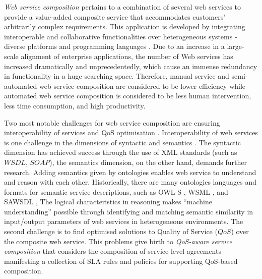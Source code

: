 \documentclass{llncs}
\begin{document}
\textit{Web service composition} pertains to a combination of several web services to provide a value-added composite service that accommodates customers' arbitrarily complex requirements. This application is developed by integrating interoperable and collaborative functionalities over heterogeneous systems - diverse platforms and programming languages \cite{casati2001technologies}. Due to an increase in a large-scale alignment of enterprise applications, the number of Web services has increased dramatically and unprecedentedly, which cause an immense redundancy in functionality in a huge searching space. Therefore, manual service and semi-automated web service composition are considered to be lower efficiency while automated web service composition is considered to be less human intervention, less time consumption, and high productivity.

Two most notable challenges for web service composition are ensuring interoperability of services and QoS optimisation \cite{fensel2011semantic}. Interoperability of web services is one challenge in the dimensions of syntactic and semantics \cite{fensel2011semantic}. The syntactic dimension has achieved success through the use of XML standards (such as $WSDL$, $SOAP$), the semantics dimension, on the other hand, demands further research. Adding semantics given by ontologies \cite{o2005review} enables web service to understand and reason with each other. Historically, there are many ontologies languages and formats for semantic service descriptions, such as OWL-S \cite{martin2004owl}, WSML \cite{fensel2006enabling}, and SAWSDL \cite{lausen2007semantic}, The logical characteristics in reasoning makes ``machine understanding'' possible through identifying and matching semantic similarity in input/output parameters of web services in heterogeneous environments. The second challenge is to find optimised solutions to Quality of Service ($QoS$) over the composite web service. This problems give birth to \textit{QoS-aware service composition} that considers the composition of service-level agreements \cite {sahai2002automated} manifesting a collection of SLA rules and policies for supporting QoS-based composition.
\end{document}
